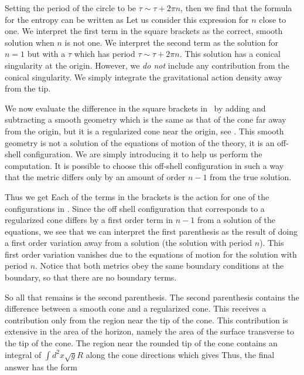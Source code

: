 Setting the period of the circle to be $ \tau \sim \tau + 2 \pi n $, then we find that the formula for the entropy
can be written as
\eqn{}
  Let us consider this expression for $n$ close to one.
  We interpret the first term in the square brackets   as the correct, smooth solution when $n$ is not one.
  We interpret the second term as the solution for $n=1$ but with a $\tau$ which has period $\tau \sim \tau + 2 \pi n$.
  This solution has a conical singularity at the origin.
   However, we {\it do not } include any contribution from the conical singularity.
  We simply integrate the gravitational action density away from the tip.

  We now evaluate the difference in the square brackets in \etnr\
  by adding and subtracting a smooth geometry which is the same
  as that of the cone far  away from the origin, but it is a regularized cone near the origin, see \fourcones .
  This smooth geometry is not a solution of the equations of motion of the theory, it is an off-shell configuration.
   We are simply introducing it to help us perform the computation. It is possible  to choose this off-shell configuration
   in such a way that the metric differs only by an amount of order $n-1$ from the true solution.

  Thus we get
 \eqn\etnr{
  S =  -   n \partial_n \left[ ( \log Z(n)  - \log Z^{\rm off}(n) ) + ( \log Z^{\rm off}(n) - n \log Z(1) ) \right]_{n=1}
  }
  Each of the terms in the brackets is the action for one of the configurations in \fourcones .
  Since the off shell configuration that corresponds to a regularized cone differs by a first order term in $n-1$ from
  a solution of the equations, we see that we can interpret the first parenthesis as the result of doing a first order
  variation away from a solution (the solution with period $n$). This first order variation vanishes due to the equations
  of motion for the solution with period $n$. Notice that both metrics obey the same boundary conditions at the
  boundary, so that there are no boundary terms.

  So all that remains is the second parenthesis. The second parenthesis contains the difference between a smooth cone
  and a regularized cone. This receives a contribution only from the region near the tip of the cone.
  This contribution
  is extensive in the area of the horizon, namely the area of the surface transverse to the tip of the cone.
   The region near the rounded  tip of the cone
   contains an integral of $\int d^2 x \sqrt{g} R$ along the cone directions which gives
  \eqn{}
  Thus, the final answer has the form
  \eqn\finans{
  S = { 1 \over 16 \pi G_N } ({\rm Area} ) \left( - n \partial_n  \int_{\rm Reg~Cone}  d^2x \sqrt{g} R \right)   = { { \rm Area } \over 4 G_N }
  }

